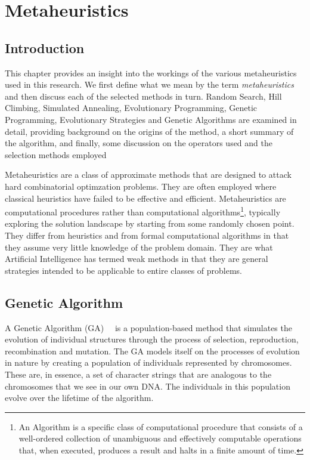 \chapter{Metaheuristics}
\section{Introduction}
This chapter provides an insight into the workings of the various metaheuristics used in this research. We first define what we mean by the term \emph{metaheuristics} and then discuss each of the selected methods in turn.
Random Search, Hill Climbing, Simulated Annealing, Evolutionary Programming, Genetic Programming, Evolutionary Strategies and Genetic Algorithms are examined in detail, providing background on the origins of the method, a short summary of the algorithm, and finally, some discussion on the operators used and the selection methods employed

Metaheuristics are a class of approximate methods that are designed to attack hard combinatorial optimzation problems. They are often employed where classical heuristics have failed to be effective and efficient. Metaheuristics are computational procedures rather than computational algorithms\footnote{An Algorithm is a specific class of computational procedure that consists of a well-ordered collection of unambiguous and effectively computable operations that, when executed, produces a result and halts in a finite amount of time.}, typically exploring the solution landscape by starting from some randomly chosen point. They differ from heuristics and from formal computational algorithms in that they assume very little knowledge of the problem domain. They are what Artificial Intelligence has termed weak methods in that they are general strategies intended to be applicable to entire classes of problems. 

\section{Genetic Algorithm}
A Genetic Algorithm (GA)~\cite{holland}~\cite{goldberg} is a population-based method that simulates the evolution of individual structures through the process of selection, reproduction, recombination and mutation.
The GA models itself on the processes of evolution in nature by creating a population of individuals represented by chromosomes. These are, in essence, a set of character strings that are analogous to the chromosomes that we see in our own DNA. The individuals in this population evolve over the lifetime of the algorithm.


